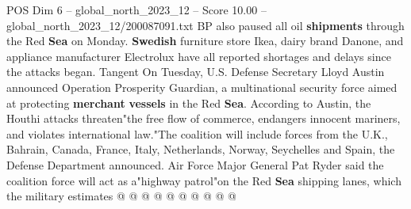 \begin{textsample}{POS Dim 6 – global\_north\_2023\_12 – Score 10.00 – global\_north\_2023\_12/200087091.txt}
BP also paused all oil \textbf{shipments} through the Red \textbf{Sea} on Monday. \textbf{Swedish} furniture store Ikea, dairy brand Danone, and appliance manufacturer Electrolux have all reported shortages and delays since the attacks began.
Tangent On Tuesday, U.S.
Defense Secretary Lloyd Austin announced Operation Prosperity Guardian, a multinational security force aimed at protecting \textbf{merchant} \textbf{vessels} in the Red \textbf{Sea}.
According to Austin, the Houthi attacks threaten"the free flow of commerce, endangers innocent mariners, and violates international law."The coalition will include forces from the U.K., Bahrain, Canada, France, Italy, Netherlands, Norway, Seychelles and Spain, the Defense Department announced.
Air Force Major General Pat Ryder said the coalition force will act as a"highway patrol"on the Red \textbf{Sea} shipping lanes, which the military estimates @ @ @ @ @ @ @ @ @ @

\end{textsample}
